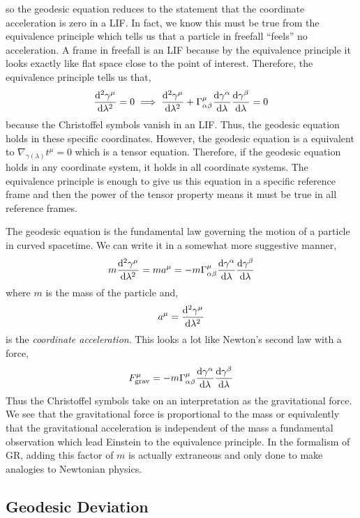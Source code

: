\documentclass[11pt, a4paper]{article}
\begin{document}
so the geodesic equation reduces to the statement that the coordinate acceleration is zero in a LIF. In fact, we know this must be true from the equivalence principle which tells us that a particle in freefall ``feels'' no acceleration. A frame in freefall is an LIF because by the equivalence principle it looks exactly like flat space close to the point of interest. Therefore, 
the equivalence principle tells us that,
\[  \frac{\mathrm{d}^{2} \gamma^\mu}{\mathrm{d}\lambda^{2}} = 0 \implies \frac{\mathrm{d}^{2} \gamma^\mu}{\mathrm{d}\lambda^{2}} + \Gamma^{\mu}_{\alpha \beta} \frac{\mathrm{d}\gamma^\alpha}{\mathrm{d}\lambda} \frac{\mathrm{d}\gamma^\beta}{\mathrm{d}\lambda}  = 0\]
because the Christoffel symbols vanish in an LIF. Thus, the geodesic equation holds in these specific coordinates. However, the geodesic equation is a equivalent to $\nabla_{\gamma(\lambda)} t^\mu = 0$ which is a tensor equation. Therefore, if the geodesic equation holds in any coordinate system, it holds in all coordinate systems. The equivalence principle is enough to give us this equation in a specific reference frame and then the power of the tensor property means it must be true in all reference frames. 
\par
The geodesic equation is the fundamental law governing the motion of a particle in curved spacetime. We can write it in a somewhat more suggestive manner,
\[  m \frac{\mathrm{d}^{2} \gamma^\mu}{\mathrm{d}\lambda^{2}} = m a^{\mu} = - m \Gamma^{\mu}_{\alpha \beta} \frac{\mathrm{d}\gamma^\alpha}{\mathrm{d}\lambda} \frac{\mathrm{d}\gamma^\beta}{\mathrm{d}\lambda} \] 
where $m$ is the mass of the particle and,
\[ a^\mu = \frac{\mathrm{d}^{2} \gamma^\mu}{\mathrm{d}\lambda^{2}} \]
is the \textit{coordinate acceleration}. This looks a lot like Newton's second law with a force,
\[ F^{\mu}_{\mathrm{grav}} = - m \Gamma^{\mu}_{\alpha \beta} \frac{\mathrm{d}\gamma^\alpha}{\mathrm{d}\lambda} \frac{\mathrm{d}\gamma^\beta}{\mathrm{d}\lambda}\]
Thus the Christoffel symbols take on an interpretation as the gravitational force. 
We see that the gravitational force is proportional to the mass or equivalently that the gravitational acceleration is independent of the mass a fundamental observation which lead Einstein to the equivalence principle. In the formalism of GR, adding this factor of $m$ is actually extraneous and only done to make analogies to Newtonian physics.   

\subsection{Geodesic Deviation}
\end{document}
